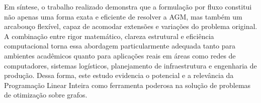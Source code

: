 Em síntese, o trabalho realizado demonstra que a formulação por fluxo constitui não apenas uma forma exata e eficiente de resolver a AGM, mas também um arcabouço flexível, capaz de acomodar extensões e variações do problema original. A combinação entre rigor matemático, clareza estrutural e eficiência computacional torna essa abordagem particularmente adequada tanto para ambientes acadêmicos quanto para aplicações reais em áreas como redes de computadores, sistemas logísticos, planejamento de infraestrutura e engenharia de produção. Dessa forma, este estudo evidencia o potencial e a relevância da Programação Linear Inteira como ferramenta poderosa na solução de problemas de otimização sobre grafos.

